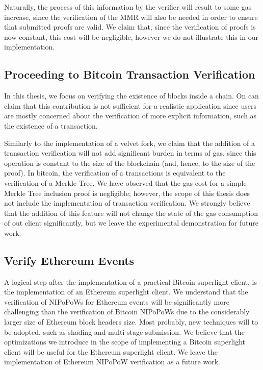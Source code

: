 Naturally, the process of this information by the verifier will result to some
gas increase, since the verification of the MMR will also be needed in order to
ensure that submitted proofs are valid. We claim that, since the verification
of proofs is now constant, this cost will be negligible, however we do not
illustrate this in our implementation.

\subsection{Proceeding to Bitcoin Transaction Verification}

In this thesis, we focus on verifying the existence of blocks inside a chain.
On can claim that this contribution is not sufficient for a realistic
application since users are mostly concerned about the verification of more
explicit information, such as the existence of a transaction.

Similarly to the implementation of a velvet fork, we claim that the addition of
a transaction verification will not add significant burden in terms of gas,
since this operation is constant to the size of the blockchain (and, hence, to
the size of the proof). In bitcoin, the verification of a transactions is
equivalent to the verification of a Merkle Tree. We have observed that the gas
cost for a simple Merkle Tree inclusion proof is negligible; however, the scope
of this thesis does not include the implementation of transaction verification.
We strongly believe that the addition of this feature will not change the state
of the gas consumption of out client significantly, but we leave the
experimental demonstration for future work.

\subsection{Verify Ethereum Events}

A logical step after the implementation of a practical Bitcoin superlight
client, is the implementation of an Ethereum superlight client. We understand
that the verification of NIPoPoWs for Ethereum events will be significantly
more challenging than the verification of Bitcoin NIPoPoWs due to the
considerably larger size of Ethereum block headers size. Most probably, new
techniques will to be adopted, such as shading and multi-stage submission.  We
believe that the optimizations we introduce in the scope of implementing a
Bitcoin superlight client will be useful for the Ethereum superlight client. We
leave the implementation of Ethereum NIPoPoW verification as a future work.

